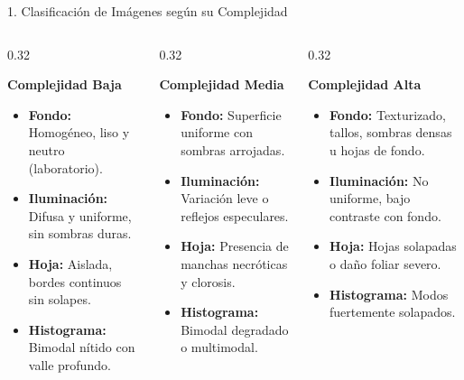 \documentclass[aspectratio=169,10pt]{beamer}
\begin{document}
\begin{frame}{1. Clasificación de Imágenes según su Complejidad}
    \begin{columns}[T]
        \begin{column}{0.32\textwidth}
            \begin{block}{\textbf{Complejidad Baja}}
                \small
                \begin{itemize}
                    \item \textbf{Fondo:} Homogéneo, liso y neutro (laboratorio).
                    \item \textbf{Iluminación:} Difusa y uniforme, sin sombras duras.
                    \item \textbf{Hoja:} Aislada, bordes continuos sin solapes.
                    \item \textbf{Histograma:} Bimodal nítido con valle profundo.
                \end{itemize}
            \end{block}
        \end{column}
        \begin{column}{0.32\textwidth}
            \begin{block}{\textbf{Complejidad Media}}
                \small
                \begin{itemize}
                    \item \textbf{Fondo:} Superficie uniforme con sombras arrojadas.
                    \item \textbf{Iluminación:} Variación leve o reflejos especulares.
                    \item \textbf{Hoja:} Presencia de manchas necróticas y clorosis.
                    \item \textbf{Histograma:} Bimodal degradado o multimodal.
                \end{itemize}
            \end{block}
        \end{column}
        \begin{column}{0.32\textwidth}
            \begin{block}{\textbf{Complejidad Alta}}
                \small
                \begin{itemize}
                    \item \textbf{Fondo:} Texturizado, tallos, sombras densas u hojas de fondo.
                    \item \textbf{Iluminación:} No uniforme, bajo contraste con fondo.
                    \item \textbf{Hoja:} Hojas solapadas o daño foliar severo.
                    \item \textbf{Histograma:} Modos fuertemente solapados.
                \end{itemize}
            \end{block}
        \end{column}
    \end{columns}
\end{frame}
\end{document}
